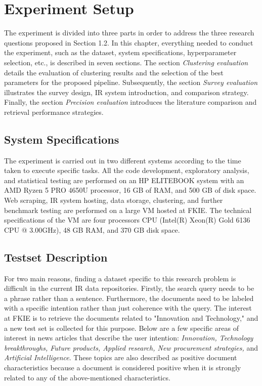 
\chapter{Experiment Setup}

The experiment is divided into three parts in order to address the three research questions proposed in Section 1.2. In this chapter, everything needed to conduct the experiment, such as the dataset, system specifications, hyperparameter selection, etc., is described in seven sections. The section \textit{Clustering evaluation} details the evaluation of clustering results and the selection of the best parameters for the proposed pipeline. Subsequently, the section \textit{Survey evaluation} illustrates the survey design, \ac{IR} system introduction, and comparison strategy. Finally, the section \textit{Precision evaluation} introduces the literature comparison and retrieval performance strategies.



	\section{System Specifications}

The experiment is carried out in two different systems according to the time taken to execute specific tasks. All the code development, exploratory analysis, and statistical testing are performed on an HP ELITEBOOK system with an AMD Ryzen 5 PRO 4650U processor, 16 GB of RAM, and 500 GB of disk space. Web scraping, \ac{IR} system hosting, data storage, clustering, and further benchmark testing are performed on a large \ac{VM} hosted at \ac{FKIE}. The technical specifications of the \ac{VM} are four processors CPU (Intel(R) Xeon(R) Gold 6136 CPU @ 3.00GHz), 48 GB RAM, and 370 GB disk space.
	
	
	\section{Testset Description}

For two main reasons, finding a dataset specific to this research problem is difficult in the current \ac{IR} data repositories. Firstly, the search query needs to be a phrase rather than a sentence. Furthermore, the documents need to be labeled with a specific intention rather than just coherence with the query. The interest at \ac{FKIE} is to retrieve the documents related to "Innovation and Technology," and a new test set is collected for this purpose. Below are a few specific areas of interest in news articles that describe the user intention: \textit{Innovation, Technology breakthroughs, Future products, Applied research, New procurement strategies,} and \textit{Artificial Intelligence}. These topics are also described as positive document characteristics because a document is considered positive when it is strongly related to any of the above-mentioned characteristics.


